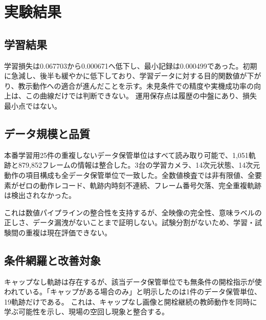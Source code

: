 \chapter{実験結果}

\section{学習結果}


学習損失は0.067703から0.000671へ低下し、最小記録は0.000499であった。初期に急減し、後半も緩やかに低下しており、学習データに対する目的関数値が下がり、教示動作への適合が進んだことを示す。未見条件での精度や実機成功率の向上は、この曲線だけでは判断できない。 運用保存点は履歴の中盤にあり、損失最小点ではない。


\section{データ規模と品質}

本番学習用25件の重複しないデータ保管単位はすべて読み取り可能で、1,051軌跡と879,852フレームの情報は整合した。3台の学習カメラ、14次元状態、14次元動作の項目構成も全データ保管単位で一致した。全数値検査では非有限値、全要素がゼロの動作レコード、軌跡内時刻不連続、フレーム番号欠落、完全重複軌跡は検出されなかった。

これは数値パイプラインの整合性を支持するが、全映像の完全性、意味ラベルの正しさ、データ漏洩がないことまで証明しない。試験分割がないため、学習・試験間の重複は現在評価できない。

\section{条件網羅と改善対象}


キャップなし軌跡は存在するが、該当データ保管単位でも無条件の開栓指示が使われている。「キャップがある場合のみ」と明示したのは1件のデータ保管単位、19軌跡だけである。 これは、キャップなし画像と開栓継続の教師動作を同時に学ぶ可能性を示し、現場の空回し現象と整合する。

